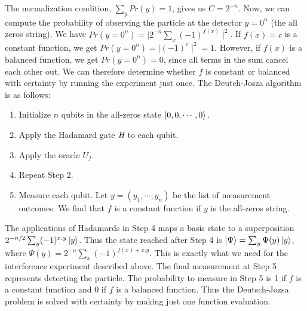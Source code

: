 \documentclass[12pt]{article}
\begin{document}
    \noindent
    The normalization condition, $\sum_{y}Pr(y) = 1$, gives us $C = 2^{-n}$. Now, we can compute the probability  of observing the particle at the detector $y = 0^n$ (the all zeros string). We have $Pr(y=0^{n}) = \mid2^{-n}\sum_{x}(-1)^{f(x)}\mid^2$. If $f(x) = c$ is a constant function, we get $Pr(y=0^{n}) = \mid(-1)^c\mid^2 = 1$. However, if $f(x)$ is a balanced function, we get $Pr(y=0^{n}) = 0$, since all terms in the sum cancel each other out. We can therefore determine whether $f$ is constant or balanced with certainty by running the experiment just once. The Deutch-Josza algorithm is as follows:
    
    \begin{enumerate}
        \item Initialize $n$ qubits in the all-zeros state $\ket{0,0,\cdots,0}.$
        \item Apply the Hadamard gate $\mbox{\em{H}}$ to each qubit.
        \item Apply the oracle $U_{f}$.
        \item Repeat Step 2.
        \item  Measure each qubit. Let $y = (y_1, \cdots, y_n)$ be the list of measurement outcomes. We find that $f$ is a constant function if $y$ is the all-zeros string.
    \end{enumerate}
    
    \noindent
   The applications of Hadamards in Step 4 maps a basis state  to a superposition $2^{-n/2}\sum_{y}(-1)^{x.y}\ket{y}$. Thus the state reached after Step 4 is $\ket{\Psi} = \sum_{y}\Psi(y)\ket{y}$, where $\Psi (y) = 2^{-n}\sum_{x}(-1)^{f(x)+x.y}$. This is exactly what we need for the interference experiment described above. The final measurement at Step 5 represents detecting the particle. The probability to measure in Step 5 is 1 if $f$ is a constant function and 0 if $f$ is a balanced function. Thus the Deutsch-Jozsa problem is solved with certainty by making just one function evaluation.
    
    
    
\end{document}
